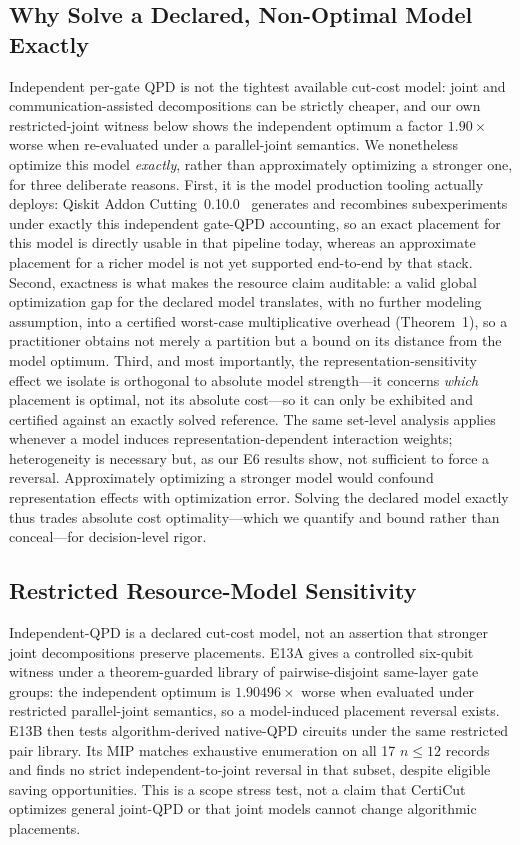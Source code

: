 \documentclass[11pt]{article}
\newcommand{\CertiCut}{CertiCut}
\newcommand{\CertiCut}{\textsc{CertiCut}}
\begin{document}
\subsection{Why Solve a Declared, Non-Optimal Model Exactly}

Independent per-gate QPD is not the tightest available cut-cost model: joint and communication-assisted decompositions can be strictly cheaper, and our own restricted-joint witness below shows the independent optimum a factor $1.90\times$ worse when re-evaluated under a parallel-joint semantics. We nonetheless optimize this model \emph{exactly}, rather than approximately optimizing a stronger one, for three deliberate reasons. First, it is the model production tooling actually deploys: Qiskit Addon Cutting~0.10.0~\cite{qiskitcutting} generates and recombines subexperiments under exactly this independent gate-QPD accounting, so an exact placement for this model is directly usable in that pipeline today, whereas an approximate placement for a richer model is not yet supported end-to-end by that stack. Second, exactness is what makes the resource claim auditable: a valid global optimization gap for the declared model translates, with no further modeling assumption, into a certified worst-case multiplicative overhead (Theorem~1), so a practitioner obtains not merely a partition but a bound on its distance from the model optimum. Third, and most importantly, the representation-sensitivity effect we isolate is orthogonal to absolute model strength---it concerns \emph{which} placement is optimal, not its absolute cost---so it can only be exhibited and certified against an exactly solved reference. The same set-level analysis applies whenever a model induces representation-dependent interaction weights; heterogeneity is necessary but, as our E6 results show, not sufficient to force a reversal. Approximately optimizing a stronger model would confound representation effects with optimization error. Solving the declared model exactly thus trades absolute cost optimality---which we quantify and bound rather than conceal---for decision-level rigor.

\subsection{Restricted Resource-Model Sensitivity}

Independent-QPD is a declared cut-cost model, not an assertion that stronger joint decompositions preserve placements. E13A gives a controlled six-qubit witness under a theorem-guarded library of pairwise-disjoint same-layer gate groups: the independent optimum is $1.90496\times$ worse when evaluated under restricted parallel-joint semantics, so a model-induced placement reversal exists. E13B then tests algorithm-derived native-QPD circuits under the same restricted pair library. Its MIP matches exhaustive enumeration on all 17 $n\le12$ records and finds no strict independent-to-joint reversal in that subset, despite eligible saving opportunities. This is a scope stress test, not a claim that \CertiCut{} optimizes general joint-QPD or that joint models cannot change algorithmic placements.
\end{document}
